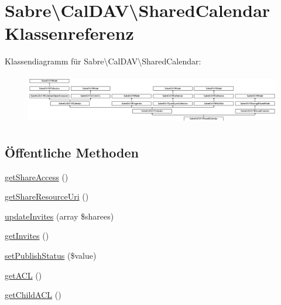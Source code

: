 \hypertarget{class_sabre_1_1_cal_d_a_v_1_1_shared_calendar}{}\section{Sabre\textbackslash{}Cal\+D\+AV\textbackslash{}Shared\+Calendar Klassenreferenz}
\label{class_sabre_1_1_cal_d_a_v_1_1_shared_calendar}
Klassendiagramm für Sabre\textbackslash{}Cal\+D\+AV\textbackslash{}Shared\+Calendar\+:\begin{figure}[H]
\begin{center}
\leavevmode
\includegraphics[height=2.196079cm]{class_sabre_1_1_cal_d_a_v_1_1_shared_calendar}
\end{center}
\end{figure}
\subsection*{Öffentliche Methoden}
\begin{DoxyCompactItemize}
\item 
\mbox{\hyperlink{class_sabre_1_1_cal_d_a_v_1_1_shared_calendar_a6a543caf4cf5c259d9a8de538fbd5e11}{get\+Share\+Access}} ()
\item 
\mbox{\hyperlink{class_sabre_1_1_cal_d_a_v_1_1_shared_calendar_a0c3380bdb7a9c6e9f7c347477e7d0dd9}{get\+Share\+Resource\+Uri}} ()
\item 
\mbox{\hyperlink{class_sabre_1_1_cal_d_a_v_1_1_shared_calendar_a6b8b622de08517a514d91581f95f09fa}{update\+Invites}} (array \$sharees)
\item 
\mbox{\hyperlink{class_sabre_1_1_cal_d_a_v_1_1_shared_calendar_afb00675ab09e20eb1b1542c7b482119d}{get\+Invites}} ()
\item 
\mbox{\hyperlink{class_sabre_1_1_cal_d_a_v_1_1_shared_calendar_afb4a48cd8825815b3bca60b342fb3dec}{set\+Publish\+Status}} (\$value)
\item 
\mbox{\hyperlink{class_sabre_1_1_cal_d_a_v_1_1_shared_calendar_acc8f8f7412ce13e3c6d59eeb5fa3db35}{get\+A\+CL}} ()
\item 
\mbox{\hyperlink{class_sabre_1_1_cal_d_a_v_1_1_shared_calendar_a8cd7a4f9142e95e15052370c34a30cc7}{get\+Child\+A\+CL}} ()
\end{DoxyCompactItemize}
